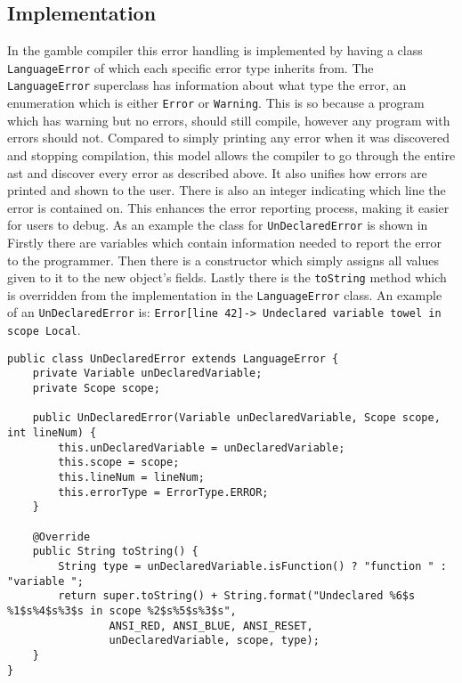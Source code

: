 \subsection*{Implementation}\label{subsec:ImplementationErrorHandling}
In the \gls{gamble} compiler this error handling is implemented by having a class \texttt{LanguageError} of which each specific error type inherits from.
The \texttt{LanguageError} superclass has information about what type the error, an enumeration which is either \texttt{Error} or \texttt{Warning}. 
This is so because a program which has warning but no errors, should still compile, however any program with errors should not. 
Compared to simply printing any error when it was discovered and stopping compilation, this model allows the compiler to go through the entire \acrshort{ast} and discover every error as described above. 
It also unifies how errors are printed and shown to the user.
There is also an integer indicating which line the error is contained on.
This enhances the error reporting process, making it easier for users to debug. 
As an example the class for \texttt{UnDeclaredError} is shown in %
Firstly there are variables which contain information needed to report the error to the programmer. 
Then there is a constructor which simply assigns all values given to it to the new object's fields.
Lastly there is the \texttt{toString} method which is overridden from the implementation in the \texttt{LanguageError} class. 
An example of an \texttt{UnDeclaredError} is: \texttt{Error[line   42]-> Undeclared variable towel in scope Local}. %

\begin{lstlisting}[caption=The UnDeclaredError class in the \gls{gamble} compiler,numbers=none,frame=tlrb,label={lst:undeclarederrorclass}]
public class UnDeclaredError extends LanguageError {
    private Variable unDeclaredVariable;
    private Scope scope;

    public UnDeclaredError(Variable unDeclaredVariable, Scope scope, int lineNum) {
        this.unDeclaredVariable = unDeclaredVariable;
        this.scope = scope;
        this.lineNum = lineNum;
        this.errorType = ErrorType.ERROR;
    }

    @Override
    public String toString() {
        String type = unDeclaredVariable.isFunction() ? "function " : "variable ";
        return super.toString() + String.format("Undeclared %6$s %1$s%4$s%3$s in scope %2$s%5$s%3$s",
                ANSI_RED, ANSI_BLUE, ANSI_RESET,
                unDeclaredVariable, scope, type);
    }
}
\end{lstlisting}

